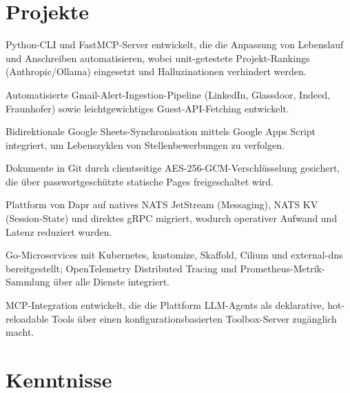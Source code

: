 \documentclass[10pt,a4paper]{resume}
\begin{document}
\section{Projekte}

\bullets
  \item Python-CLI und FastMCP-Server entwickelt, die die Anpassung von Lebenslauf und Anschreiben automatisieren, wobei unit-getestete Projekt-Rankings (Anthropic/Ollama) eingesetzt und Halluzinationen verhindert werden.
  \item Automatisierte Gmail-Alert-Ingestion-Pipeline (LinkedIn, Glassdoor, Indeed, Fraunhofer) sowie leichtgewichtiges Guest-API-Fetching entwickelt.
  \item Bidirektionale Google Sheets-Synchronisation mittels Google Apps Script integriert, um Lebenszyklen von Stellenbewerbungen zu verfolgen.
  \item Dokumente in Git durch clientseitige AES-256-GCM-Verschlüsselung gesichert, die über passwortgeschützte statische Pages freigeschaltet wird.
\bulletsend
\vspace{1.0pt}
\bullets
  \item Plattform von Dapr auf natives NATS JetStream (Messaging), NATS KV (Session-State) und direktes gRPC migriert, wodurch operativer Aufwand und Latenz reduziert wurden.
  \item Go-Microservices mit Kubernetes, kustomize, Skaffold, Cilium und external-dns bereitgestellt; OpenTelemetry Distributed Tracing und Prometheus-Metrik-Sammlung über alle Dienste integriert.
  \item MCP-Integration entwickelt, die die Plattform LLM-Agents als deklarative, hot-reloadable Tools über einen konfigurationsbasierten Toolbox-Server zugänglich macht.
\bulletsend

\section{Kenntnisse}
\end{document}
